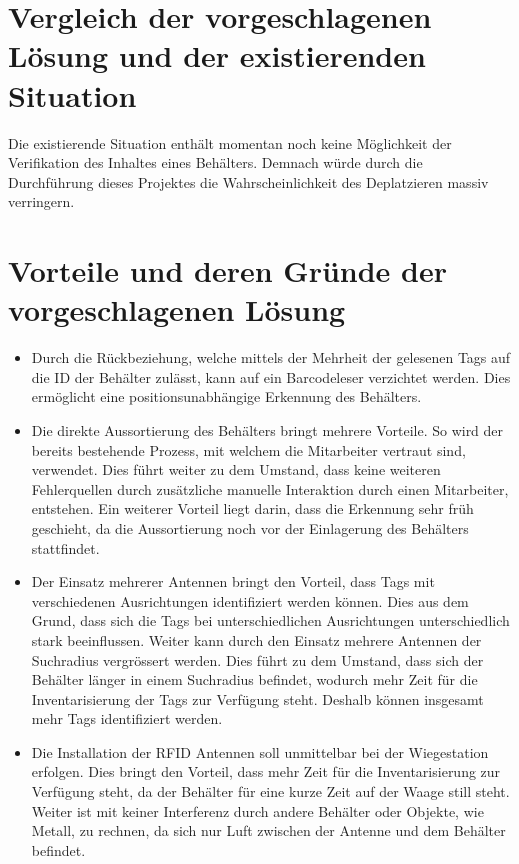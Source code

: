 \section{Vergleich der vorgeschlagenen Lösung und der existierenden Situation}
Die existierende Situation enthält momentan noch keine Möglichkeit der Verifikation des Inhaltes eines Behälters. Demnach würde durch die Durchführung dieses Projektes die Wahrscheinlichkeit des Deplatzieren massiv verringern.

\section{Vorteile und deren Gründe der vorgeschlagenen Lösung}
\begin{itemize}
	\item Durch die Rückbeziehung, welche mittels der Mehrheit der gelesenen Tags auf die ID der Behälter zulässt, kann auf ein Barcodeleser verzichtet werden. Dies ermöglicht eine positionsunabhängige Erkennung des Behälters.
	\item Die direkte Aussortierung des Behälters bringt mehrere Vorteile. So wird der bereits bestehende Prozess, mit welchem die Mitarbeiter vertraut sind, verwendet. Dies führt weiter zu dem Umstand, dass keine weiteren Fehlerquellen durch zusätzliche manuelle Interaktion durch einen Mitarbeiter, entstehen. Ein weiterer Vorteil liegt darin, dass die Erkennung sehr früh geschieht, da die Aussortierung noch vor der Einlagerung des Behälters stattfindet.
	\item Der Einsatz mehrerer Antennen bringt den Vorteil, dass Tags mit verschiedenen Ausrichtungen identifiziert werden können. Dies aus dem Grund, dass sich die Tags bei unterschiedlichen Ausrichtungen unterschiedlich stark beeinflussen. Weiter kann durch den Einsatz mehrere Antennen der Suchradius vergrössert werden. Dies führt zu dem Umstand, dass sich der Behälter länger in einem Suchradius befindet, wodurch mehr Zeit für die Inventarisierung der Tags zur Verfügung steht. Deshalb können insgesamt mehr Tags identifiziert  werden.
	\item Die Installation der RFID Antennen soll unmittelbar bei der Wiegestation erfolgen. Dies bringt den Vorteil, dass mehr Zeit für die Inventarisierung zur Verfügung steht, da der Behälter für eine kurze Zeit auf der Waage still steht. Weiter ist mit keiner Interferenz durch andere Behälter oder Objekte, wie Metall, zu rechnen, da sich nur Luft zwischen der Antenne und dem Behälter befindet.
\end{itemize}


